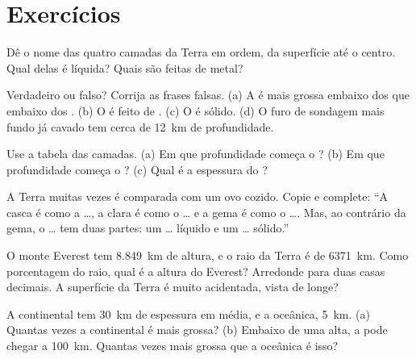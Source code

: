 \section{Exercícios}

\begin{exercise}[$\star$]\label{exo:g6:inside-the-earth:1}
Dê o nome das quatro camadas da Terra em ordem, da superfície até o
centro. Qual delas é líquida? Quais são feitas de metal?
\end{exercise}

\begin{exercise}[$\star$]\label{exo:g6:inside-the-earth:2}
Verdadeiro ou falso? Corrija as frases falsas.
(a) A  é mais grossa embaixo dos  que embaixo dos .
(b) O  é feito de .
(c) O  é sólido.
(d) O furo de sondagem mais fundo já cavado tem cerca de 12~km de profundidade.
\end{exercise}

\begin{exercise}[$\star$]\label{exo:g6:inside-the-earth:3}
Use a tabela das camadas. (a) Em que profundidade começa o ? (b) Em
que profundidade começa o ? (c) Qual é a espessura do ?
\end{exercise}

\begin{exercise}[$\star$]\label{exo:g6:inside-the-earth:4}
A Terra muitas vezes é comparada com um ovo cozido. Copie e complete: ``A
casca é como a \ldots, a clara é como o \ldots{} e a gema é como o
\ldots{}. Mas, ao contrário da gema, o \ldots{} tem duas partes: um
\ldots{} líquido e um \ldots{} sólido.''
\end{exercise}

\begin{exercise}[$\star\star$]\label{exo:g6:inside-the-earth:5}
O monte Everest tem 8.849~km de altura, e o raio da Terra é de 6371~km.
Como porcentagem do raio, qual é a altura do Everest? Arredonde para duas
casas decimais. A superfície da Terra é muito acidentada, vista de longe?
\end{exercise}

\begin{exercise}[$\star\star$]\label{exo:g6:inside-the-earth:6}
A  continental tem 30~km de espessura em média, e a  oceânica,
5~km. (a) Quantas vezes a  continental é mais grossa? (b) Embaixo de
uma  alta, a  pode chegar a 100~km. Quantas vezes mais
grossa que a  oceânica é isso?
\end{exercise}

